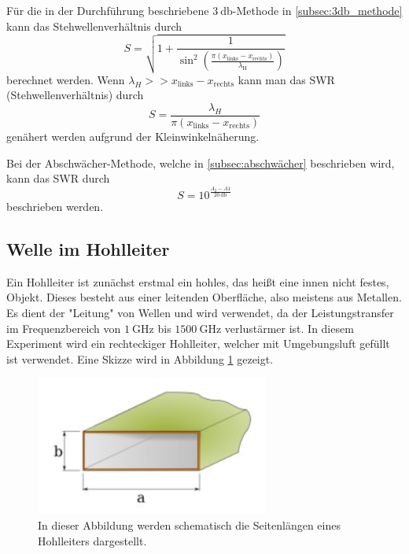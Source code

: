 Für die in der Durchführung beschriebene $\qty{3}{\decibel}$-Methode in \autoref{subsec:3db_methode} kann das Stehwellenverhältnis durch 
\begin{equation}
              \label{eqn:S_3dB}
              S = \sqrt{1+\frac{1}{\sin^2\left(\frac{\pi(x_\mathrm{links}-x_\mathrm{rechts})}{\lambda_\mathrm{H}}\right)}}
\end{equation}
berechnet werden. Wenn $\lambda_H >> x_\mathrm{links}-x_\mathrm{rechts}$ kann man das SWR (Stehwellenverhältnis) durch 
\begin{equation}
              \label{eqn:S_3dB_easy}
              S = \frac{\lambda_H}{\pi(x_\mathrm{links}-x_\mathrm{rechts})}
\end{equation}
genähert werden aufgrund der Kleinwinkelnäherung.

Bei der Abschwächer-Methode, welche in \autoref{subsec:abschwächer} beschrieben wird, kann das SWR durch 
\begin{equation}
              \label{eqn:S_abschwaecher}
              S = 10^\frac{A_2-A1}{\qty{20}{\decibel}}
\end{equation}
beschrieben werden.
\subsection{Welle im Hohlleiter}
\label{subsec:hohlleiter}
Ein Hohlleiter ist zunächst erstmal ein hohles, das heißt eine innen nicht festes, Objekt. Dieses besteht aus einer leitenden Oberfläche, also meistens aus Metallen. Es dient der 
"Leitung" von Wellen und wird verwendet, da der Leistungstransfer im Frequenzbereich von $\qty{1}{\giga\hertz}$ bis $\qty{1500}{\giga\hertz}$ verlustärmer ist. In diesem Experiment
wird ein rechteckiger Hohlleiter, welcher mit Umgebungsluft gefüllt ist verwendet. Eine Skizze wird in Abbildung \ref{fig:hohlleiter} gezeigt.

\begin{figure}
              \centering
              \includegraphics{content/hohlleiter.PNG}
              \caption{In dieser Abbildung werden schematisch die Seitenlängen eines Hohlleiters dargestellt.}
              \label{fig:hohlleiter}
\end{figure}

